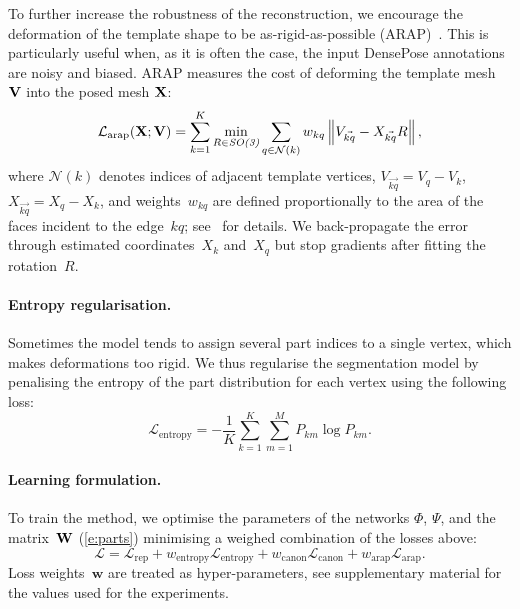 To further increase the robustness of the reconstruction, we encourage the deformation of the template shape to be as-rigid-as-possible (ARAP)~\cite{Sorkine2007}.
This is particularly useful when, as it is often the case, the input DensePose annotations are noisy and biased.
ARAP measures the cost of deforming the template mesh $\mathbf{V}$ into the posed mesh $\mathbf{X}$:
\begin{equation}\label{e:arap}
\mathcal{L}_\text{arap}(\mathbf{X};\mathbf{V})
=
\sum_{k=1}^K
\min_{R \in \textit{SO(3)}}
\sum_{q \in \mathcal{N}(k)} 
w_{kq} 
\left \|
V_{\vec{kq}} - X_{\vec{kq}}R
\right \|,
\end{equation}
where $\mathcal{N}(k)$ denotes indices of adjacent template vertices,
$V_{\vec{kq}} = V_q - V_k$, $X_{\vec{kq}} = X_q - X_k$, 
and weights~$w_{kq}$ are defined proportionally to the area of the faces incident to the edge~$kq$;
see~\cite{Sorkine2007} for details.
We back-propagate the error through estimated coordinates~$X_k$ and~$X_q$ but stop gradients after fitting the rotation~$R$.

\paragraph{Entropy regularisation.}

Sometimes the model tends to assign several part indices to a single vertex, which makes deformations too rigid.
We thus regularise the segmentation model by penalising the entropy of the part distribution for each vertex using the following loss:
\begin{equation}\label{e:entropy}
\mathcal{L}_{\textrm{entropy}} = - \frac{1}{K} \sum_{k=1}^K \sum_{m=1}^M P_{km} \log P_{km}.
\end{equation}

\paragraph{Learning formulation.}

To train the method, we optimise the parameters of the networks $\Phi$, $\Psi$, and the matrix~$\mathbf{W}$ (\cref{e:parts}) minimising a weighed combination of the losses above:
\begin{equation}\label{e:totalloss}
\mathcal{L}
=
\mathcal{L}_{\textrm{rep}} +
w_{\textrm{entropy}} \mathcal{L}_{\textrm{entropy}} +
w_{\textrm{canon}} \mathcal{L}_{\textrm{canon}} +
w_{\textrm{arap}} \mathcal{L}_{\textrm{arap}}.
\end{equation}
Loss weights~$\mathbf{w}$ are treated as hyper-parameters, see supplementary material for the values used for the experiments.